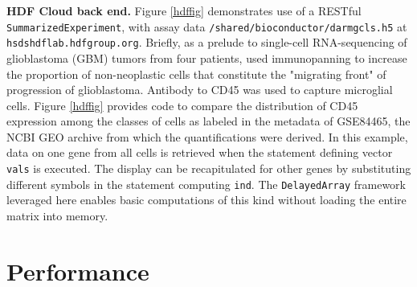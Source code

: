 \documentclass[applications]{gen-bioinformatics}
\newcommand{\Rpackage}[1]{{\textit{#1}}}
\begin{document}
\noindent
\textbf{HDF Cloud back end.}  Figure \ref{hdffig}
demonstrates use of a RESTful \texttt{SummarizedExperiment},
with assay data \texttt{/shared/bioconductor/darmgcls.h5}
at \texttt{hsdshdflab.hdfgroup.org}.  Briefly, as a
prelude to single-cell RNA-sequencing of glioblastoma (GBM)
tumors from four patients,
\cite{Darmanis2017} used immunopanning to increase the
proportion of non-neoplastic cells that constitute
the "migrating front" of progression of glioblastoma.
Antibody to CD45 was used to capture microglial cells.
Figure \ref{hdffig} provides code to compare
the distribution of CD45 expression among the
classes of
cells as labeled in the metadata of GSE84465,
the NCBI GEO archive from which the quantifications
were derived.  In this example, data on one
gene from all cells
is retrieved when the statement defining vector \texttt{vals}
is executed.  The display can be recapitulated for
other genes by substituting different symbols in
the statement computing \texttt{ind}.
The \verb+DelayedArray+ framework leveraged here
enables basic computations of this kind without loading the
entire matrix into memory.

\noindent



\section*{Performance}
\end{document}
